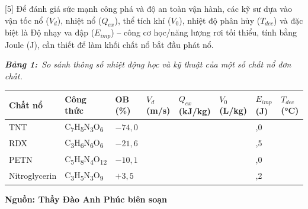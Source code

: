 \documentclass[12pt,a4paper,twoside]{article}
\newcommand{\tablecaption}[2]{%
    \par\vspace{2pt}%
    {\centering\textbf{\textit{Bảng #1:}}~\textit{#2}\par}%
    \vspace{0pt}%
}
\newenvironment{readingpassage}[1][]{%
    \begin{tcolorbox}[enhanced, colback=grayLight, colframe=secondaryBlue,
        coltitle=textDark, fonttitle=\bfseries, title={#1},
        rounded corners, arc=3mm, boxrule=1pt,
        left=15pt, right=15pt, top=10pt, bottom=10pt,
        breakable, before skip=10pt, after skip=10pt, drop fuzzy shadow]
    \setstretch{1.3}
}{\end{tcolorbox}}
\begin{document}
\begin{readingpassage}[]
[5] Để đánh giá sức mạnh công phá và độ an toàn vận hành, các kỹ sư dựa vào vận tốc nổ ($V_d$), nhiệt nổ ($Q_{ex}$), thể tích khí ($V_0$), nhiệt độ phân hủy ($T_{dec}$) và đặc biệt là Độ nhạy va đập ($E_{imp}$) -- công cơ học/năng lượng rơi tối thiểu, tính bằng Joule (J), cần thiết để làm khối chất nổ bắt đầu phát nổ.

\vspace{6pt}
\tablecaption{1}{So sánh thông số nhiệt động học và kỹ thuật của một số chất nổ đơn chất.}
\renewcommand{\arraystretch}{1.4}
{\small
{}%
\begin{center}
\begin{tabular}{|>{\centering\arraybackslash}m{2.2cm}|>{\centering\arraybackslash}m{2.2cm}|>{\centering\arraybackslash}m{1.2cm}|>{\centering\arraybackslash}m{1.2cm}|>{\centering\arraybackslash}m{1.2cm}|>{\centering\arraybackslash}m{1.2cm}|>{\centering\arraybackslash}m{1.2cm}|>{\centering\arraybackslash}m{1.2cm}|}
\hline
\rowcolor{primaryBlue!12}
\textbf{Chất nổ} & \textbf{Công thức} & \textbf{OB (\%)} & \textbf{$V_d$ (m/s)} & \textbf{$Q_{ex}$ (kJ/kg)} & \textbf{$V_0$ (L/kg)} & \textbf{$E_{imp}$ (J)} & \textbf{$T_{dec}$ (°C)} \\
\hline
TNT & C\textsubscript{7}H\textsubscript{5}N\textsubscript{3}O\textsubscript{6} & $-74{,}0$ & 6900 & 4200 & 730 & 15,0 & 295 \\
\hline
RDX & C\textsubscript{3}H\textsubscript{6}N\textsubscript{6}O\textsubscript{6} & $-21{,}6$ & 8750 & 5540 & 900 & 7,5 & 210 \\
\hline
PETN & C\textsubscript{5}H\textsubscript{8}N\textsubscript{4}O\textsubscript{12} & $-10{,}1$ & 8400 & 5790 & 780 & 3,0 & 190 \\
\hline
Nitroglycerin & C\textsubscript{3}H\textsubscript{5}N\textsubscript{3}O\textsubscript{9} & $+3{,}5$ & 7700 & 6300 & 782 & 0,2 & 160 \\
\hline
\end{tabular}
\end{center}
}

\hfill\textbf{Nguồn: Thầy Đào Anh Phúc biên soạn}
\end{readingpassage}
\vspace{2pt}
\end{document}

